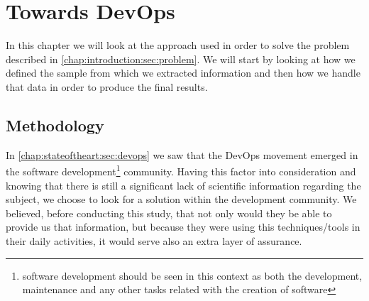 \chapter{Towards DevOps} \label{chap:towardsdevops}
    In this chapter we will look at the approach used in order to solve the problem described in \ref{chap:introduction:sec:problem}. We will start by looking at how we defined the sample from which we extracted information and then how we handle that data in order to produce the final results.

    \section{Methodology} \label{chap:towardsdevops:sec:methodology}
      In \ref{chap:stateoftheart:sec:devops} we saw that the DevOps movement emerged in the software development\footnote{software development should be seen in this context as both the development, maintenance and any other tasks related with the creation of software} community. Having this factor into consideration and knowing that there is still a significant lack of scientific information regarding the subject, we choose to look for a solution within the development community. We believed, before conducting this study, that not only would they be able to provide us that information, but because they were using this techniques/tools in their daily activities, it would serve also an extra layer of assurance.


